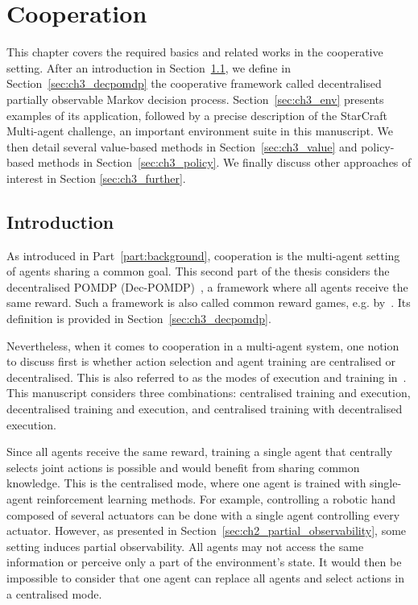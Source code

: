 \chapter{Cooperation}\label{ch:cooperation}
\begin{chapter_outline}

This chapter covers the required basics and related works in the cooperative setting.
After an introduction in Section~\ref{sec:ch3_intro}, we define in Section~\ref{sec:ch3_decpomdp} the cooperative framework called decentralised partially observable Markov decision process.
Section~\ref{sec:ch3_env} presents examples of its application, followed by a precise description of the StarCraft Multi-agent challenge, an important environment suite in this manuscript.
We then detail several value-based methods in Section~\ref{sec:ch3_value} and policy-based methods in Section~\ref{sec:ch3_policy}.
We finally discuss other approaches of interest in Section \ref{sec:ch3_further}.
\end{chapter_outline}

\section{Introduction}
\label{sec:ch3_intro}
As introduced in Part~\ref{part:background}, cooperation is the multi-agent setting of agents sharing a common goal.
This second part of the thesis considers the decentralised POMDP (Dec-POMDP)~\citep{DecPomdp}, a framework where all agents receive the same reward.
Such a framework is also called common reward games, e.g. by~\cite{marl-book}.
Its definition is provided in Section~\ref{sec:ch3_decpomdp}.

Nevertheless, when it comes to cooperation in a multi-agent system, one notion to discuss first is whether action selection and agent training are centralised or decentralised.
This is also referred to as the modes of execution and training in~\citep{marl-book}.
This manuscript considers three combinations: centralised training and execution, decentralised training and execution, and centralised training with decentralised execution.

Since all agents receive the same reward, training a single agent that centrally selects joint actions is possible and would benefit from sharing common knowledge.
This is the centralised mode, where one agent is trained with single-agent reinforcement learning methods.
For example, controlling a robotic hand composed of several actuators can be done with a single agent controlling every actuator.
However, as presented in Section~\ref{sec:ch2_partial_observability}, some setting induces partial observability.
All agents may not access the same information or perceive only a part of the environment's state.
It would then be impossible to consider that one agent can replace all agents and select actions in a centralised mode.

